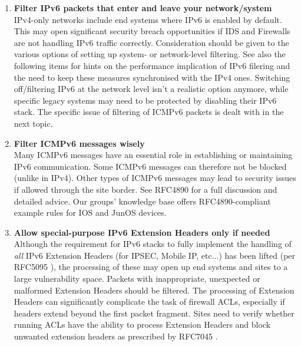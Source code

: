 \begin{enumerate}
\item {\bf Filter IPv6 packets that enter and leave your network/system}\\
IPv4-only networks include end systems where IPv6 is enabled by default.
This may open significant security breach opportunities
if IDS and Firewalls are not handling IPv6 traffic correctly.
Consideration should be given to the various options of setting
up system- or network-level filtering. See also the following items
for hints on the performance implication of IPv6 filering and the
need to keep these measures synchronised with the IPv4 ones.
Switching off/filtering IPv6 at the network level isn't a realistic
option anymore, while specific legacy systems may need to be protected
by disabling their IPv6 stack.
The specific issue of filtering of ICMPv6 packets is dealt with in the
next topic. 


\item {\bf Filter ICMPv6 messages wisely} \\
Many ICMPv6 messages have an essential role in establishing or maintaining
IPv6 communication.
Some ICMPv6 messages can therefore not be blocked (unlike in IPv4).
Other types of ICMPv6 messages may lead to security issues if allowed through
the site border. See RFC4890 \cite{rfc} for a full discussion and detailed advice.
Our groups' knowledge base \cite{ipv6wg} offers RFC4890-compliant example
rules for IOS and JunOS devices.


\item {\bf Allow special-purpose IPv6 Extension Headers only if needed} \\
Although the requirement for IPv6 stacks to fully implement the handling
of {\it all} IPv6 Extension Headers (for IPSEC, Mobile IP, etc...) has been lifted
(per RFC5095 \cite{rfc}),
the processing of these may open up end systems and sites to a large
vulnerability space. 
Packets with inappropriate, unexpected or malformed Extension Headers should
be filtered. The processing of Extension Headers can significantly complicate the
task of firewall ACLs, especially if headers extend beyond the first packet
fragment.
Sites need to verify whether running ACLs have the ability to process Extension
Headers and block unwanted extension headers as prescribed by RFC7045
\cite{rfc}.



\end{enumerate}
